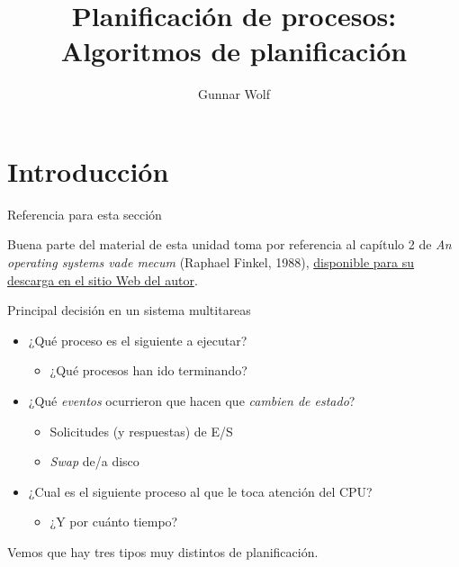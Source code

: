 \documentclass[presentation]{beamer}
\author{Gunnar Wolf}
\date{}
\title{Planificación de procesos: Algoritmos de planificación}
\begin{document}
\maketitle

\section{Introducción}
\label{sec:org47607af}

\begin{frame}[label={sec:orgea78ae4}]{Referencia para esta sección}
\begin{center}
Buena parte del material de esta unidad toma por referencia al
capítulo 2 de \emph{An operating systems vade mecum} (Raphael Finkel,
1988), \href{ftp://ftp.cs.uky.edu/cs/manuscripts/vade.mecum.2.pdf}{disponible para su descarga en el sitio Web del autor}.
\end{center}
\end{frame}

\begin{frame}[label={sec:orgcbe6c5d}]{Principal decisión en un sistema multitareas}
\begin{itemize}
\item ¿Qué proceso es el siguiente a ejecutar?
\begin{itemize}
\item ¿Qué procesos han ido terminando?
\end{itemize}
\item ¿Qué \emph{eventos} ocurrieron que hacen que \emph{cambien de estado}?
\begin{itemize}
\item Solicitudes (y respuestas) de E/S
\item \emph{Swap} de/a disco
\end{itemize}
\item ¿Cual es el siguiente proceso al que le toca atención del CPU?
\begin{itemize}
\item ¿Y por cuánto tiempo?
\end{itemize}
\end{itemize}
\begin{center}
Vemos que hay tres tipos muy distintos de planificación.
\end{center}
\end{frame}
\end{document}
